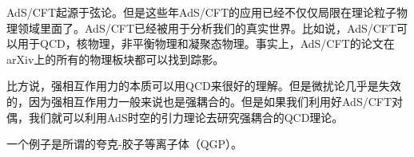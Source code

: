 
AdS/CFT起源于弦论。但是这些年AdS/CFT的应用已经不仅仅局限在理论粒子物理领域里面了。AdS/CFT已经被用于分析我们的真实世界。比如说，AdS/CFT可以用于QCD，核物理，非平衡物理和凝聚态物理。事实上，AdS/CFT的论文在arXiv上的所有的物理板块都可以找到踪影。

比方说，强相互作用力的本质可以用QCD来很好的理解。但是微扰论几乎是失效的，因为强相互作用力一般来说也是强耦合的。但是如果我们利用好AdS/CFT对偶，我们就可以利用AdS时空的引力理论去研究强耦合的QCD理论。

一个例子是所谓的夸克-胶子等离子体（QGP）。